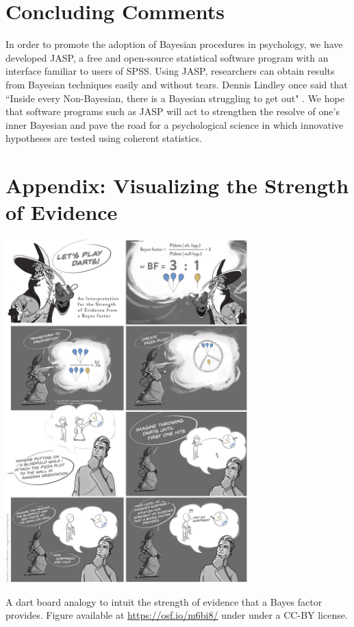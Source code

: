 \section{Concluding Comments}
In order to promote the adoption of Bayesian procedures in psychology, we have developed JASP, a free and open-source statistical software program with an interface familiar to users of SPSS. Using JASP, researchers can obtain results from Bayesian techniques easily and without tears. Dennis Lindley once said that ``Inside every Non-Bayesian, there is a Bayesian struggling to get out" \cite{Jaynes2003}. We hope that software programs such as JASP will act to strengthen the resolve of one's inner Bayesian and pave the road for a psychological science in which innovative hypotheses are tested using coherent statistics.




\section*{Appendix: Visualizing the Strength of Evidence}
\begin{center}
\includegraphics[width=0.7\textwidth]{figs/bi2_LetsPlayDarts.eps}%
\end{center}
\noindent A dart board analogy to intuit the strength of evidence that a Bayes factor provides. Figure available at \url{https://osf.io/m6bi8/} under under a CC-BY license.

